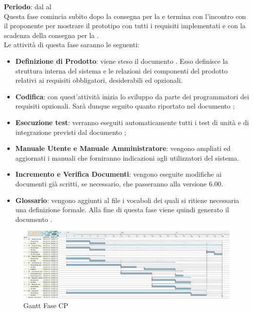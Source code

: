 	\textbf{Periodo}: dal  al  \\Questa fase comincia subito dopo la consegna per la  e termina con l'incontro con il proponente per mostrare il prototipo con tutti i requisiti implementati e con la scadenza della consegna per la . 
	\\Le attività di questa fase saranno le seguenti:
	\begin{itemize}
		\item\textbf{Definizione di Prodotto}: viene steso il documento . Esso definisce la struttura interna del sistema e le relazioni dei componenti del prodotto relativi ai requisiti obbligatori, desiderabili ed opzionali.
		\item \textbf{Codifica}: con quest'attività inizia lo sviluppo da parte dei programmatori dei requisiti opzionali. Sarà dunque seguito quanto riportato nel documento ;
		\item \textbf{Esecuzione test}: verranno eseguiti automaticamente tutti i test di unità e di integrazione previsti dal documento ;
		\item\textbf{Manuale Utente e Manuale Amministratore}: vengono ampliati ed aggiornati i manuali che forniranno indicazioni agli utilizzatori del sistema.
		\item\textbf{Incremento e Verifica Documenti}: vengono eseguite modifiche ai documenti già scritti, se necessario, che passeranno alla versione 6.00.
		\item\textbf{Glossario}: vengono aggiunti al file  i vocaboli dei quali si ritiene necessaria una definizione formale. Alla fine di questa fase viene quindi generato il documento .
	\end{itemize}
	\begin{figure}[H]\centering
		\includegraphics[width=\textwidth]{PianoDiProgetto/Pics/FaseCP.png}
	\caption{Gantt Fase CP}
\end{figure}
